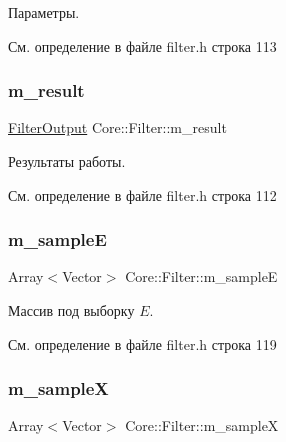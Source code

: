 Параметры. 

См. определение в файле filter.\+h строка 113

\hypertarget{class_core_1_1_filter_a1ae638614492df7edeaa2db4f528ad65}{}\label{class_core_1_1_filter_a1ae638614492df7edeaa2db4f528ad65} 
\subsubsection{\texorpdfstring{m\+\_\+result}{m\_result}}
{\footnotesize\ttfamily \hyperlink{namespace_core_a60877581a235fc9566087b54d463ce9c}{Filter\+Output} Core\+::\+Filter\+::m\+\_\+result\hspace{0.3cm}{\ttfamily [protected]}}

Результаты работы. 

См. определение в файле filter.\+h строка 112

\hypertarget{class_core_1_1_filter_acab6dcadb8caf8f05cb2beeb1deafd74}{}\label{class_core_1_1_filter_acab6dcadb8caf8f05cb2beeb1deafd74} 
\subsubsection{\texorpdfstring{m\+\_\+sampleE}{m\_sampleE}}
{\footnotesize\ttfamily Array$<$Vector$>$ Core\+::\+Filter\+::m\+\_\+sampleE\hspace{0.3cm}{\ttfamily [protected]}}

Массив под выборку $E$. 

См. определение в файле filter.\+h строка 119

\hypertarget{class_core_1_1_filter_abed73a8bfce99d24418f6dee90c44333}{}\label{class_core_1_1_filter_abed73a8bfce99d24418f6dee90c44333} 
\subsubsection{\texorpdfstring{m\+\_\+sampleX}{m\_sampleX}}
{\footnotesize\ttfamily Array$<$Vector$>$ Core\+::\+Filter\+::m\+\_\+sampleX\hspace{0.3cm}{\ttfamily [protected]}}

